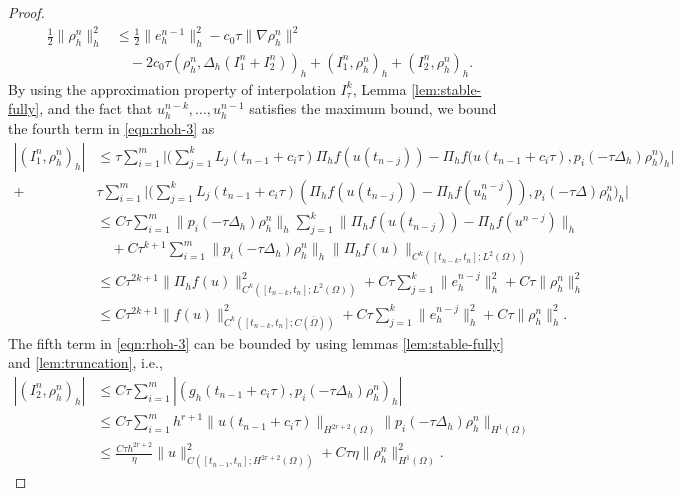 \documentclass[10pt,final,leqno,onefignum,onetabnum]{siamltex}%
\def\II{(\Omega)}
\begin{document}
\begin{proof}
\begin{equation}
\begin{aligned}
 \frac12 \| \rho_h^n \|_h^2 %
&\le \frac12\|  e_h^{n-1} \|_h^2 - c_0\tau \| \nabla \rho_h^n\|^2\\
&\quad- 2c_0\tau ( \rho_h^n,\Delta_h (I_1^n+I_2^n))_h + (I_1^n,\rho_h^n)_h + (I_2^n,\rho_h^n)_h.
\end{aligned}
\end{equation}
By using the approximation property of interpolation $I_\tau^k$, Lemma \ref{lem:stable-fully},
 and the fact that $u_h^{n-k},\dots,u_h^{n-1}$ satisfies the maximum bound,
we bound the fourth term in \eqref{eqn:rhoh-3}  as
\begin{align*}
 | (I_1^n,\rho_h^n)_h |  &\le   \tau \sum_{i=1}^m \Big|\Big( \sum_{j=1}^k L_j(t_{n-1} + c_i\tau) \Pi_hf(u(t_{n-j}))- \Pi_h f(u(t_{n-1} + c_i\tau), p_i(-\tau \Delta_h)\rho_h^n\Big)_h\Big|   \\
 +&  \tau \sum_{i=1}^m \Big| \Big( \sum_{j=1}^k L_j(t_{n-1} + c_i\tau) (\Pi_h f(u(t_{n-j}))-\Pi_hf(u_h^{n-j})), p_i(-\tau \Delta)\rho_h^n\Big)_h \Big| \\
   &\le  C \tau \sum_{i=1}^m \|p_i(-\tau \Delta_h)\rho_h^n \|_h  \sum_{j=1}^k  \|\Pi_hf(u(t_{n-j}))- \Pi_h f(u^{n-j})\|_h   \\
     &\quad+  C \tau^{k+1} \sum_{i=1}^m  \|p_i(-\tau \Delta_h)\rho_h^n \|_h  \|  \Pi_h f(u)  \|_{C^{k}([t_{n-k},t_n]; L^2\II)} \\
 &\le C\tau^{2k+1} \|  \Pi_h f(u)  \|_{C^{k}([t_{n-k},t_n]; L^2\II)}^2 + C \tau \sum_{j=1}^k \|  e_h^{n-j}  \|_h^2 +  C\tau \|  \rho_h^n \|_h^2 \\
  &\le C\tau^{2k+1} \|  f(u)  \|_{C^{k}([t_{n-k},t_n]; C(\bar\Omega))}^2 + C \tau \sum_{j=1}^k \|  e_h^{n-j}  \|_h^2 +  C\tau \|  \rho_h^n \|_h^2.
\end{align*}
The fifth term in \eqref{eqn:rhoh-3} can be bounded by using lemmas \ref{lem:stable-fully} and \ref{lem:truncation}, i.e.,
\begin{equation}\label{eqn:fully-I2}
\begin{split}
| (I_2^n,\rho_h^n)_h | &\le C \tau \sum_{i=1}^m |(g_h(t_{n-1}+c_i\tau), p_i(-\tau\Delta_h)\rho_h^n)_h| \\
&\le C\tau \sum_{i=1}^m h^{r+1} \| u(t_{n-1}+c_i\tau)  \|_{H^{2r+2}(\Omega)} \| p_i(-\tau\Delta_h) \rho_h^n \|_{H^1\II} \\
&\le \frac{C \tau h^{2r+2}}{\eta}  \| u  \|_{C([t_{n-1},t_n];H^{2r+2}(\Omega))}^2 + C\tau \eta  \| \rho_h^n \|_{H^1\II}^2.

\end{split}
\end{equation}
\end{proof}
\end{document}
